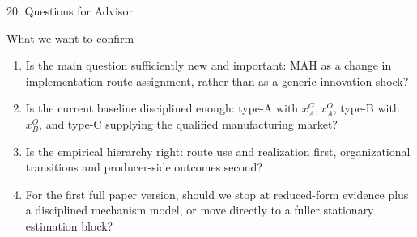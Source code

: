 \documentclass[aspectratio=169,11pt]{beamer}
\begin{document}
\begin{frame}{20. Questions for Advisor}
\footnotesize
\begin{block}{What we want to confirm}
\begin{enumerate}
\item Is the main question sufficiently new and important: MAH as a change in implementation-route assignment, rather than as a generic innovation shock?
\item Is the current baseline disciplined enough: type-A with \(x_A^G,x_A^O\), type-B with \(x_B^O\), and type-C supplying the qualified manufacturing market?
\item Is the empirical hierarchy right: route use and realization first, organizational transitions and producer-side outcomes second?
\item For the first full paper version, should we stop at reduced-form evidence plus a disciplined mechanism model, or move directly to a fuller stationary estimation block?
\end{enumerate}
\end{block}
\end{frame}
\end{document}
